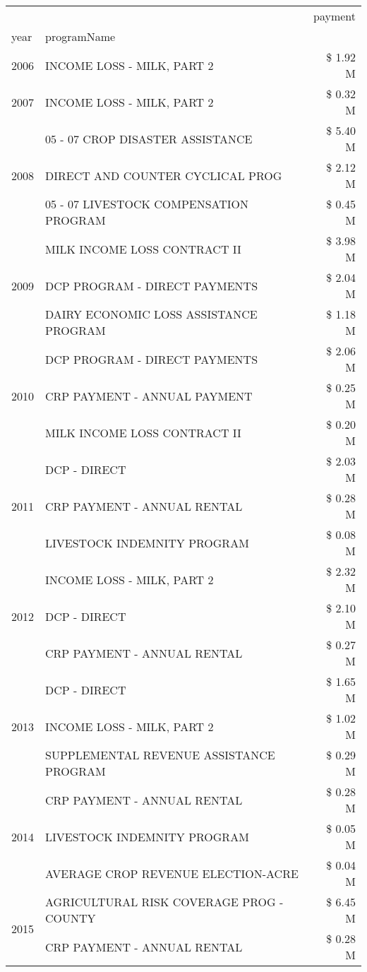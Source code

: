 \begin{tabular}{llr}
\toprule
 &  & payment \\
year & programName &  \\
\midrule
2006 & INCOME LOSS - MILK, PART 2 & \$ 1.92 M \\
\cline{1-3}
2007 & INCOME LOSS - MILK, PART 2 & \$ 0.32 M \\
\cline{1-3}
\multirow[t]{3}{*}{2008} & 05 - 07 CROP DISASTER ASSISTANCE & \$ 5.40 M \\
 & DIRECT AND COUNTER CYCLICAL PROG & \$ 2.12 M \\
 & 05 - 07 LIVESTOCK COMPENSATION PROGRAM & \$ 0.45 M \\
\cline{1-3}
\multirow[t]{3}{*}{2009} & MILK INCOME LOSS CONTRACT II & \$ 3.98 M \\
 & DCP PROGRAM - DIRECT PAYMENTS & \$ 2.04 M \\
 & DAIRY ECONOMIC LOSS ASSISTANCE PROGRAM & \$ 1.18 M \\
\cline{1-3}
\multirow[t]{3}{*}{2010} & DCP PROGRAM - DIRECT PAYMENTS & \$ 2.06 M \\
 & CRP PAYMENT - ANNUAL PAYMENT & \$ 0.25 M \\
 & MILK INCOME LOSS CONTRACT II & \$ 0.20 M \\
\cline{1-3}
\multirow[t]{3}{*}{2011} & DCP - DIRECT & \$ 2.03 M \\
 & CRP PAYMENT - ANNUAL RENTAL & \$ 0.28 M \\
 & LIVESTOCK INDEMNITY PROGRAM & \$ 0.08 M \\
\cline{1-3}
\multirow[t]{3}{*}{2012} & INCOME LOSS - MILK, PART 2 & \$ 2.32 M \\
 & DCP - DIRECT & \$ 2.10 M \\
 & CRP PAYMENT - ANNUAL RENTAL & \$ 0.27 M \\
\cline{1-3}
\multirow[t]{3}{*}{2013} & DCP - DIRECT & \$ 1.65 M \\
 & INCOME LOSS - MILK, PART 2 & \$ 1.02 M \\
 & SUPPLEMENTAL REVENUE ASSISTANCE PROGRAM & \$ 0.29 M \\
\cline{1-3}
\multirow[t]{3}{*}{2014} & CRP PAYMENT - ANNUAL RENTAL & \$ 0.28 M \\
 & LIVESTOCK INDEMNITY PROGRAM & \$ 0.05 M \\
 & AVERAGE CROP REVENUE ELECTION-ACRE & \$ 0.04 M \\
\cline{1-3}
\multirow[t]{3}{*}{2015} & AGRICULTURAL RISK COVERAGE PROG - COUNTY & \$ 6.45 M \\
 & CRP PAYMENT - ANNUAL RENTAL & \$ 0.28 M \\

\end{tabular}
